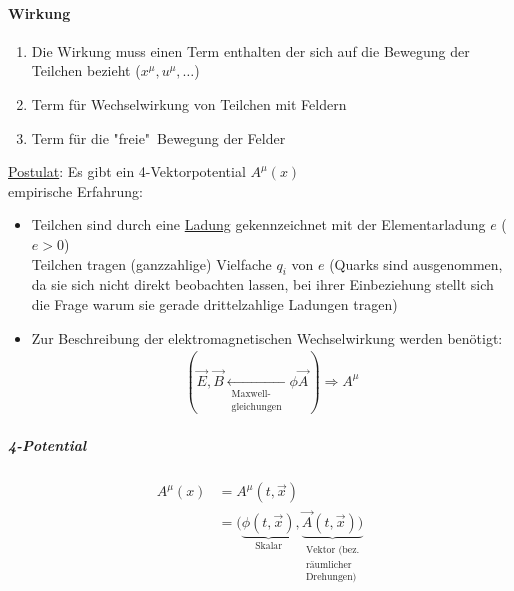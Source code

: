 \documentclass[a4paper]{article}
\begin{document}
\paragraph{Wirkung}
\begin{enumerate}
  \item Die Wirkung muss einen Term enthalten der sich auf die Bewegung der Teilchen
bezieht ($x^\mu,u^\mu,\ldots$)
  \item Term für Wechselwirkung von Teilchen mit Feldern
  \item Term für die "freie"\ Bewegung der Felder 
\end{enumerate}
\underline{Postulat}: Es gibt ein 4-Vektorpotential $A^\mu(x)$\\
empirische Erfahrung:
\begin{itemize}
  \item Teilchen sind durch eine \underline{Ladung} gekennzeichnet mit der
    Elementarladung $e$ ($e>0$) \\
	Teilchen tragen (ganzzahlige) Vielfache $q_i$ von $e$ (Quarks sind ausgenommen,
	da sie sich nicht direkt beobachten lassen, bei ihrer Einbeziehung stellt sich
	die Frage warum sie gerade drittelzahlige Ladungen tragen)
  \item Zur Beschreibung der elektromagnetischen Wechselwirkung werden
  benötigt:\\
  \begin{align}
  	(\vec{E},\vec{B}\underset{\substack{\text{Maxwell-}\\
    \text{gleichungen}}}{\leftarrow}\phi \vec{A}) \Rightarrow A^\mu
  \end{align}
\end{itemize}
\subparagraph{4-Potential}
\begin{align}
A^\mu(x)&=A^\mu(t,\vec{x})\\
&=(\underbrace{\phi(t,\vec{x})}_{\text{Skalar}},\underbrace{\vec{A}(t,\vec{x}))}_{
\substack{\text{Vektor (bez.} \\\text{räumlicher}\\\text{Drehungen)}}}
\end{align}
\end{document}

